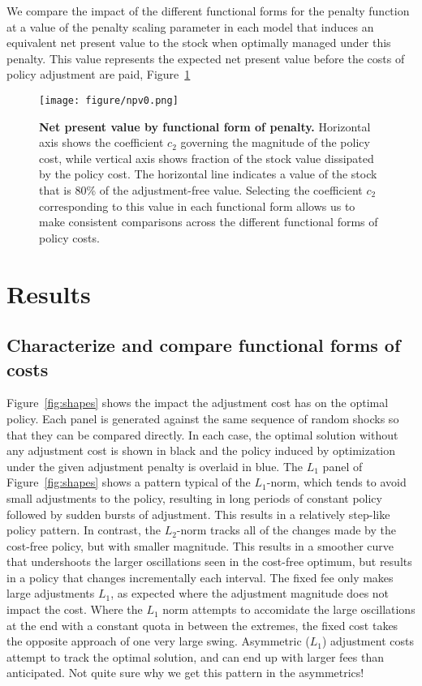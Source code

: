 \documentclass[authoryear, review, 12pt]{elsarticle}
\begin{document}
We compare the impact of the different functional forms for the penalty
function at a value of the penalty scaling parameter in each model that
induces an equivalent net present value to the stock when optimally
managed under this penalty. This value represents the expected net
present value before the costs of policy adjustment are paid, Figure~\ref{fig:apples}

  \begin{figure}
    \begin{center}
\texttt{[image: figure/npv0.png]}
\caption{\textbf{Net present value by functional form of penalty.} Horizontal axis shows the coefficient $c_2$ governing the magnitude of the policy cost, while vertical axis shows fraction of the stock value dissipated by the policy cost.  The horizontal line indicates a value of the stock that is 80\% of the adjustment-free value. Selecting the coefficient $c_2$ corresponding to this value in each functional form allows us to make consistent comparisons across the different functional forms of policy costs.  }
\label{fig:apples}
\end{center}
\end{figure}


\section{Results}
\subsection{Characterize and compare functional forms of costs}

Figure~\ref{fig:shapes} shows the impact the adjustment cost has on the optimal policy.   Each panel is generated against the same sequence of random shocks so that they can be compared directly.  In each case, the optimal solution without any adjustment cost is shown in black and the policy induced by optimization under the given adjustment penalty is overlaid in blue.  The $L_1$ panel of Figure~\ref{fig:shapes} shows a pattern typical of the $L_1$-norm, which tends to avoid small adjustments to the policy, resulting in long periods of constant policy followed by sudden bursts of adjustment. This results in a relatively step-like policy pattern.  In contrast, the $L_2$-norm tracks all of the changes made by the cost-free policy, but with smaller magnitude.  This results in a smoother curve that undershoots the larger oscillations seen in the cost-free optimum, but results in a policy that changes incrementally each interval.  The fixed fee only makes large adjustments $L_1$, as expected where the adjustment magnitude does not impact the cost.  Where the $L_1$ norm attempts to accomidate the large oscillations at the end with a constant quota in between the extremes, the fixed cost takes the opposite approach of one very large swing.  Asymmetric ($L_1$) adjustment costs attempt to track the optimal solution, and can end up with larger fees than anticipated.  {\color{green}Not quite sure why we get this pattern in the asymmetrics!}
\end{document}
